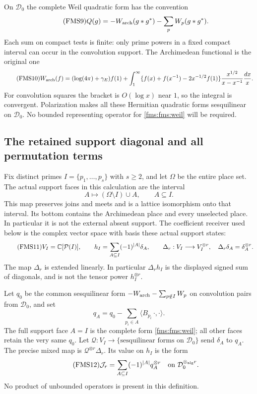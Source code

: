 On $\mathcal D_0$ the complete Weil quadratic form has the convention
\begin{equation}\tag{FMS9}\label{fms:fms:weil}
 Q(g)=-W_{\rm arch}(g*g^*)-\sum_p W_p(g*g^*).
\end{equation}
Each sum on compact tests is finite: only prime powers in a fixed
compact interval can occur in the convolution support.
The Archimedean functional is the original one
\begin{equation}\tag{FMS10}\label{fms:fms:arch}
 W_{\rm arch}(f)
 =(\log(4\pi)+\gamma_E)f(1)+
 \int_1^\infty
 \{f(x)+f(x^{-1})-2x^{-1/2}f(1)\}
       \frac{x^{1/2}}{x-x^{-1}}\frac{dx}{x}.
\end{equation}
For convolution squares the bracket is $O(\log x)$ near $1$, so
the integral is convergent.  Polarization makes all these Hermitian
quadratic forms sesquilinear on $\mathcal D_0$.  No bounded
representing operator for \eqref{fms:fms:weil} will be required.

\subsection{The retained support diagonal and all permutation terms}

Fix distinct primes $I=\{p_1,\ldots,p_s\}$ with $s\ge2$, and let
$\Omega$ be the entire place set.  The actual support faces in this
calculation are the interval
\[
 A\longmapsto(\Omega\setminus I)\cup A,\qquad A\subseteq I.
\]
This map preserves joins and meets and is a lattice isomorphism
onto that interval. Its bottom contains the Archimedean place and
every unselected place.  In particular it is not the external
absent support.  The coefficient receiver used below is the complex
vector space with basis these actual support states:
\begin{equation}\tag{FMS11}\label{fms:fms:diagonal}
 V_I=\mathbb C[\mathcal P(I)],\qquad
 h_I=\sum_{A\subseteq I}(-1)^{|A|}\delta_A,\qquad
 \Delta_r:V_I\longrightarrow V_I^{\otimes r},\quad
 \Delta_r\delta_A=\delta_A^{\otimes r}.
\end{equation}
The map $\Delta_r$ is extended linearly.  In particular
$\Delta_rh_I$ is the displayed signed sum of diagonals, and is not
the tensor power $h_I^{\otimes r}$.

Let $q_0$ be the common sesquilinear form
$-W_{\rm arch}-\sum_{p\notin I}W_p$ on convolution pairs from
$\mathcal D_0$, and set
\[
 q_A=q_0-\sum_{p_i\in A}\langle B_{p_i}\,\cdot,\cdot\rangle.
\]
The full support face $A=I$ is the complete form
\eqref{fms:fms:weil}; all other faces retain the very same $q_0$.
Let $\mathcal Q:V_I\to
\{\text{sesquilinear forms on }\mathcal D_0\}$ send
$\delta_A$ to $q_A$.  The precise mixed map is
$\mathcal Q^{\otimes r}\Delta_r$.  Its value on $h_I$ is the form
\begin{equation}\tag{FMS12}\label{fms:fms:mixedform}
 \mathcal J_r=\sum_{A\subseteq I}(-1)^{|A|}q_A^{\otimes r}
 \quad\hbox{on }\mathcal D_0^{\otimes_{\rm alg} r}.
\end{equation}
No product of unbounded operators is present in this definition.

